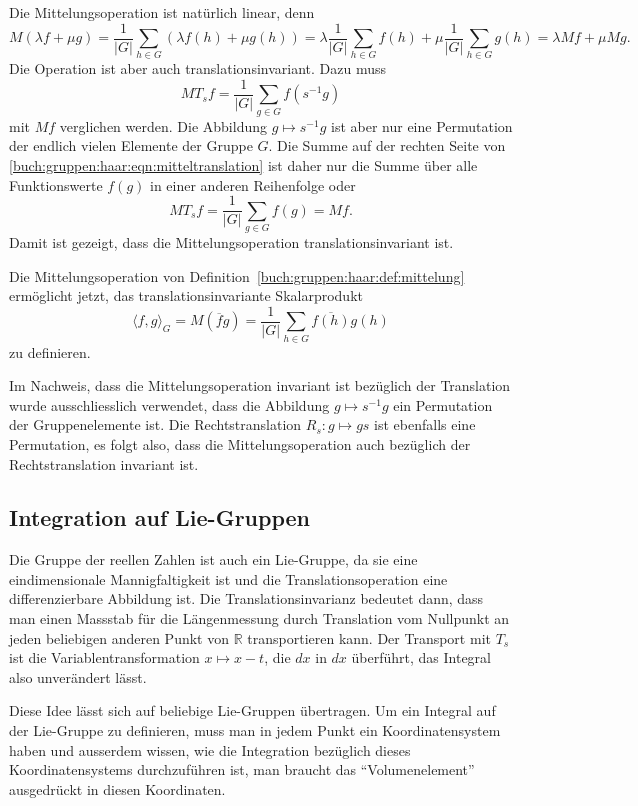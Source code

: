 Die Mittelungsoperation ist natürlich linear, denn
\[
M(\lambda f + \mu g)
=
\frac{1}{|G|}
\sum_{h\in G}
(\lambda f(h)+\mu g(h))
=
\lambda \frac{1}{|G|}\sum_{h\in G}f(h)
+
\mu \frac{1}{|G|}\sum_{h\in G}g(h)
=
\lambda Mf + \mu Mg.
\]
Die Operation ist aber auch translationsinvariant.
Dazu muss
\begin{equation}
MT_sf
=
\frac{1}{|G|}
\sum_{g\in G} f(s^{-1}g)
\label{buch:gruppen:haar:eqn:mitteltranslation}
\end{equation}
mit $Mf$ verglichen werden.
Die Abbildung $g\mapsto s^{-1}g$ ist aber nur eine Permutation der endlich
vielen Elemente der Gruppe $G$.
Die Summe auf der rechten Seite von
\eqref{buch:gruppen:haar:eqn:mitteltranslation}
ist daher nur die Summe über alle Funktionswerte $f(g)$ in einer anderen
Reihenfolge oder
\[
MT_sf
=
\frac{1}{|G|} \sum_{g\in G}f(g)
=Mf.
\]
Damit ist gezeigt, dass die Mittelungsoperation translationsinvariant
ist.

Die Mittelungsoperation von Definition~\ref{buch:gruppen:haar:def:mittelung}
ermöglicht jetzt, das translationsinvariante Skalarprodukt
\[
\langle f,g\rangle_G
=
M(\overline{f}g)
=
\frac{1}{|G|}
\sum_{h\in G}
\overline{f(h)}g(h)
\]
zu definieren.

Im Nachweis, dass die Mittelungsoperation invariant ist bezüglich
der Translation wurde ausschliesslich verwendet, dass die Abbildung
$g\mapsto s^{-1}g$ ein Permutation der Gruppenelemente ist.
Die Rechtstranslation $R_s\colon g\mapsto gs$ ist ebenfalls eine
Permutation, es folgt also, dass die Mittelungsoperation auch
bezüglich der Rechtstranslation invariant ist.

%
%
\subsection{Integration auf Lie-Gruppen
\label{buch:haar:subsection:lie-gruppen}}
Die Gruppe der reellen Zahlen ist auch ein Lie-Gruppe, da sie eine
eindimensionale Mannigfaltigkeit ist und die Translationsoperation
eine differenzierbare Abbildung ist.
Die Translationsinvarianz bedeutet dann, dass man einen Massstab für
die Längenmessung durch Translation vom Nullpunkt an jeden beliebigen
anderen Punkt von $\mathbb{R}$ transportieren kann.
Der Transport mit $T_s$ ist die Variablentransformation $x\mapsto x-t$,
die $dx$ in $dx$ überführt, das Integral also unverändert lässt.

Diese Idee lässt sich auf beliebige Lie-Gruppen übertragen.
Um ein Integral auf der Lie-Gruppe zu definieren, muss man in jedem
Punkt ein Koordinatensystem haben und ausserdem wissen, wie die
Integration bezüglich dieses Koordinatensystems durchzuführen ist,
man braucht das ``Volumenelement'' ausgedrückt in diesen Koordinaten.

